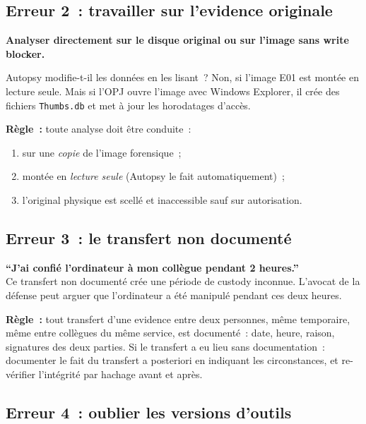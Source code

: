\subsection{Erreur 2~: travailler sur l'evidence originale}

\begin{boxalert}
\textbf{Analyser directement sur le disque original ou sur l'image sans
write blocker.}

Autopsy modifie-t-il les données en les lisant~? Non, si l'image E01 est
montée en lecture seule. Mais si l'OPJ ouvre l'image avec Windows Explorer,
il crée des fichiers \texttt{Thumbs.db} et met à jour les horodatages d'accès.

\textbf{Règle~:} toute analyse doit être conduite~:
\begin{enumerate}
    \item sur une \emph{copie} de l'image forensique~;
    \item montée en \emph{lecture seule} (Autopsy le fait automatiquement)~;
    \item l'original physique est scellé et inaccessible sauf sur autorisation.
\end{enumerate}
\end{boxalert}

\subsection{Erreur 3~: le transfert non documenté}

\begin{boxalert}
\textbf{``J'ai confié l'ordinateur à mon collègue pendant 2 heures.''}\\
Ce transfert non documenté crée une période de custody inconnue.
L'avocat de la défense peut arguer que l'ordinateur a été manipulé
pendant ces deux heures.

\textbf{Règle~:} tout transfert d'une evidence entre deux personnes, même
temporaire, même entre collègues du même service, est documenté~: date,
heure, raison, signatures des deux parties. Si le transfert a eu lieu sans
documentation~: documenter le fait du transfert a posteriori en indiquant
les circonstances, et re-vérifier l'intégrité par hachage avant et après.
\end{boxalert}

\subsection{Erreur 4~: oublier les versions d'outils}

